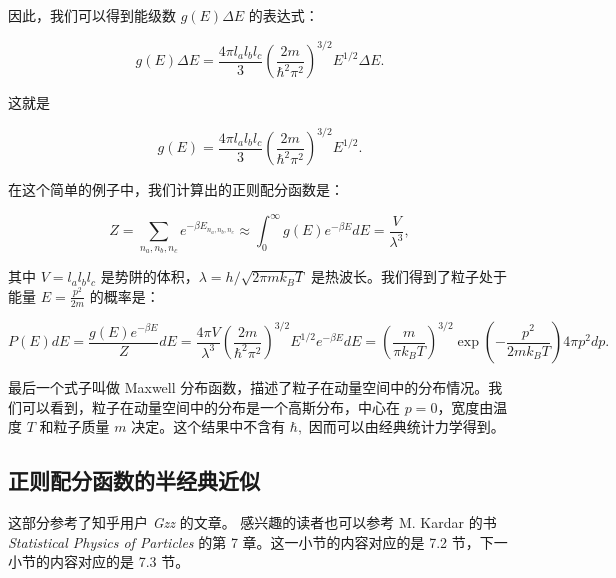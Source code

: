 因此，我们可以得到能级数 $g(E) \Delta E$ 的表达式：
\begin{linenomath}\begin{equation}
g(E) \Delta E = \frac{4\pi l_al_bl_c}{3} \left( \frac{2m}{\hbar^2 \pi^2} \right)^{3/2} E^{1/2} \Delta E.
\end{equation}\end{linenomath}
这就是
\begin{linenomath}\begin{equation}
g(E) = \frac{4\pi l_al_bl_c}{3} \left( \frac{2m}{\hbar^2 \pi^2} \right)^{3/2} E^{1/2}.
\end{equation}\end{linenomath}

在这个简单的例子中，我们计算出的正则配分函数是：
\begin{linenomath}\begin{equation}
Z = \sum_{n_a, n_b, n_c} e^{-\beta E_{n_a, n_b, n_c}} \approx \int_0^\infty g(E) e^{-\beta E} dE = \frac{V}{\lambda^3},
\end{equation}\end{linenomath}
其中 $V = l_a l_b l_c$ 是势阱的体积，$\lambda = h / \sqrt{2\pi m k_B T}$ 是热波长。我们得到了粒子处于能量 $E = \frac{p^2}{2m}$ 的概率是：
\begin{linenomath}\begin{equation}
P(E) dE = \frac{g(E) e^{-\beta E}}{Z} dE = \frac{4\pi V}{\lambda^3} \left( \frac{2m}{\hbar^2 \pi^2} \right)^{3/2} E^{1/2} e^{-\beta E} dE = \left( \frac{m}{\pi k_BT} \right)^{3/2} \exp\left( -\frac{p^2}{2m k_B T} \right) 4\pi p^2 dp.
\end{equation}\end{linenomath}
最后一个式子叫做 Maxwell 分布函数，描述了粒子在动量空间中的分布情况。我们可以看到，粒子在动量空间中的分布是一个高斯分布，中心在 $p=0$，宽度由温度 $T$ 和粒子质量 $m$ 决定。这个结果中不含有 $\hbar,$ 因而可以由经典统计力学得到。
\subsection{正则配分函数的半经典近似}
{\kaishu \noindent 这部分参考了知乎用户 \textit{Gzz} 的文章。 感兴趣的读者也可以参考 M. Kardar 的书 \textit{Statistical Physics of Particles} 的第 7 章。这一小节的内容对应的是 7.2 节，下一小节的内容对应的是 7.3 节。}

